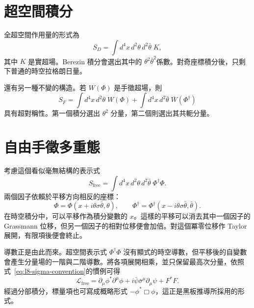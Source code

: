 \section{超空間積分}

全超空間作用量的形式為
\begin{equation}
S_D=\int d^4x\,d^2\theta\,d^2\bar\theta\;K,
\label{eq:l8-D-term-action}
\end{equation}
其中 \(K\) 是實超場。Berezin 積分會選出其中的
\(\theta^2\bar\theta^2\)係數。對奇座標積分後，只剩下普通的時空拉格朗日量。

還有另一種不變的構造。若 \(W(\Phi)\) 是手徵超場，則
\begin{equation}
S_F=\int d^4x\,d^2\theta\;W(\Phi)
+\int d^4x\,d^2\bar\theta\;\overline{W}(\Phi^\dagger)
\label{eq:l8-F-term-action}
\end{equation}
具有超對稱性。第一個積分選出 \(\theta^2\) 分量，第二個則選出其共軛分量。

\begin{classroomqa}
\end{classroomqa}

\section{自由手徵多重態}

考慮這個看似毫無結構的表示式
\begin{equation}
S_{\mathrm{free}}
=\int d^4x\,d^2\theta\,d^2\bar\theta\;
\Phi^\dagger\Phi.
\label{eq:l8-free-superaction}
\end{equation}
兩個因子依賴於平移方向相反的座標：
\begin{equation}
\Phi=\Phi(x+i\theta\sigma\bar\theta,\theta),
\qquad
\Phi^\dagger
=\Phi^\dagger(x-i\theta\sigma\bar\theta,\bar\theta).
\end{equation}
在時空積分中，可以平移作為積分變數的 \(x\)。這樣的平移可以消去其中一個因子的 Grassmann 位移，但另一個因子的相對位移便會加倍。對這個冪零位移作 Taylor 展開，有限項後便會終止。

導數正是由此而來。超空間表示式
\(\Phi^\dagger\Phi\)
沒有顯式的時空導數，但平移後的自變數會產生分量場的一階與二階導數。將各項展開相乘，並只保留最高次分量，依照式~\eqref{eq:l8-sigma-convention}的慣例可得
\begin{equation}
\mathcal L_{\mathrm{free}}
=\partial_\mu\phi^\ast\partial^\mu\phi
+i\bar\psi\bar\sigma^\mu\partial_\mu\psi
+F^\ast F.
\label{eq:l8-free-component-lagrangian}
\end{equation}
經過分部積分，標量項也可寫成概略形式 \(-\phi^\ast\Box\phi\)，這正是黑板推導所採用的形式。

